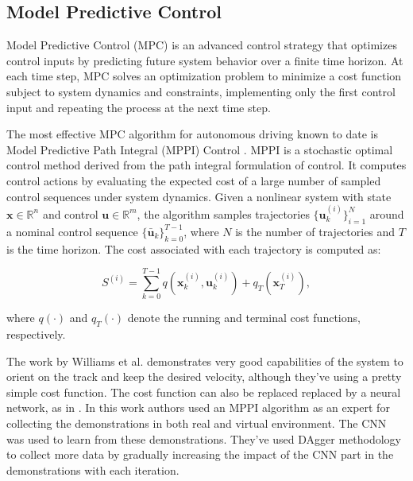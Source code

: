 \subsection{Model Predictive Control}

Model Predictive Control (MPC) is an advanced control strategy that optimizes control inputs by predicting future system behavior over a finite time horizon. At each time step, MPC solves an optimization problem to minimize a cost function subject to system dynamics and constraints, implementing only the first control input and repeating the process at the next time step.

The most effective MPC algorithm for autonomous driving known to date is Model Predictive Path Integral (MPPI) Control \autocite{williams2017model} \autocite{kappen2005linear}. MPPI is a stochastic optimal control method derived from the path integral formulation of control. It computes control actions by evaluating the expected cost of a large number of sampled control sequences under system dynamics. Given a nonlinear system with state \(\mathbf{x} \in \mathbb{R}^n\) and control \(\mathbf{u} \in \mathbb{R}^m\), the algorithm samples trajectories \(\{\mathbf{u}_k^{(i)}\}_{i=1}^N\) around a nominal control sequence \(\{\bar{\mathbf{u}}_k\}_{k=0}^{T-1}\), where \(N\) is the number of trajectories and \(T\) is the time horizon. The cost associated with each trajectory is computed as:

\[
  S^{(i)} = \sum_{k=0}^{T-1} q(\mathbf{x}_k^{(i)}, \mathbf{u}_k^{(i)}) + q_T(\mathbf{x}_T^{(i)}),
\]

where \(q(\cdot)\) and \(q_T(\cdot)\) denote the running and terminal cost functions, respectively.

The work by Williams et al. \autocite{williams2016aggressive} demonstrates very good capabilities of the system to orient on the track and keep the desired velocity, although they've using a pretty simple cost function. The cost function can also be replaced replaced by a neural network, as in \autocite{drews2017aggressivedeepdrivingmodel}. In this work \autocite{pan2019agileautonomousdrivingusing} authors used an MPPI algorithm as an expert for collecting the demonstrations in both real and virtual environment. The CNN was used to learn from these demonstrations. They've used DAgger methodology \autocite{ross2011reduction} to collect more data by gradually increasing the impact of the CNN part in the demonstrations with each iteration.
